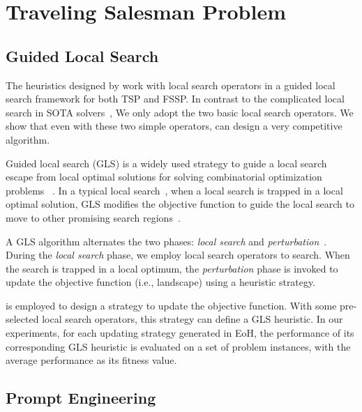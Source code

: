 \section{Traveling Salesman Problem}


\subsection{Guided Local Search}

The heuristics designed by \ourmethod{} work with local search operators in a guided local search framework for both TSP and FSSP. In contrast to the complicated local search in SOTA solvers~\cite{LKH3}, We only adopt the two basic local search operators. We show that even with these two simple operators, \ourmethod{} can design a very competitive algorithm.

Guided local search (GLS) is a widely used strategy to guide a local search escape from local optimal solutions for solving combinatorial optimization problems ~\cite{alsheddy2018guided,voudouris1999guided}. In a typical local search~\cite{alsheddy2018guided}, when a local search is trapped in a local optimal solution, GLS modifies the objective function to guide the local search to move to other promising search regions~\cite {alsheddy2018guided}.

A GLS algorithm alternates the two phases: \textit{local search} and \textit{perturbation}~\cite{arnold2019knowledge}. During the \textit{local search} phase, we employ local search operators to search. When the search is trapped in a local optimum, the \textit{perturbation} phase is invoked to update the objective function (i.e., landscape) using a heuristic strategy. 


\ourmethod{} is employed to design a strategy to update the objective function. With some pre-selected local search operators, this strategy can define a GLS heuristic. In our experiments, for each updating strategy generated in EoH, the performance of its corresponding GLS heuristic is evaluated on a set of problem instances, with the average performance as its fitness value.

\subsection{Prompt Engineering}

